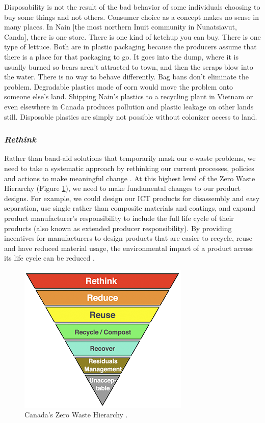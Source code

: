 \documentclass{article}
\begin{document}
\begin{fquote}
Disposability is not the result of the bad behavior of some individuals choosing to buy some things and not others. Consumer choice as a concept makes no sense in many places. In Nain [the most northern Inuit community in Nunatsiavut, Canda], there is one store. There is one kind of ketchup you can buy. There is one type of lettuce. Both are in plastic packaging because the producers assume that there is a place for that packaging to go. It goes into the dump, where it is usually burned so bears aren't attracted to town, and then the scraps blow into the water. There is no way to behave differently. Bag bans don't eliminate the problem. Degradable plastics made of corn would move the problem onto someone else's land. Shipping Nain's plastics to a recycling plant in Vietnam or even elsewhere in Canada produces pollution and plastic leakage on other lands still. Disposable plastics are simply not possible without colonizer access to land.
\end{fquote}


\subsubsection*{\textit{Rethink}}
Rather than band-aid solutions that temporarily mask our e-waste problems, we need to take a systematic approach by rethinking our current processes, policies and actions to make meaningful change \cite{zerowastecanada2017hierarchy}. At this highest level of the Zero Waste Hierarchy (Figure \ref{zero_waste_hierarchy}), we need to make fundamental changes to our product designs. For example, we could design our ICT products for disassembly and easy separation, use single rather than composite materials and coatings, and expand product manufacturer's responsibility to include the full life cycle of their products (also known as extended producer responsibility). By providing incentives for manufacturers to design products that are easier to recycle, reuse and have reduced material usage, the environmental impact of a product across its life cycle can be reduced \cite{walls2006extended}.

\begin{figure}[h]
    \includegraphics[width=.5\textwidth]{./images/zero_waste_hierarchy_crop.png}
    \centering
    \caption{Canada's Zero Waste Hierarchy \cite{zerowastecanada2017hierarchy}.}
    \label{zero_waste_hierarchy}
\end{figure}
\end{document}
